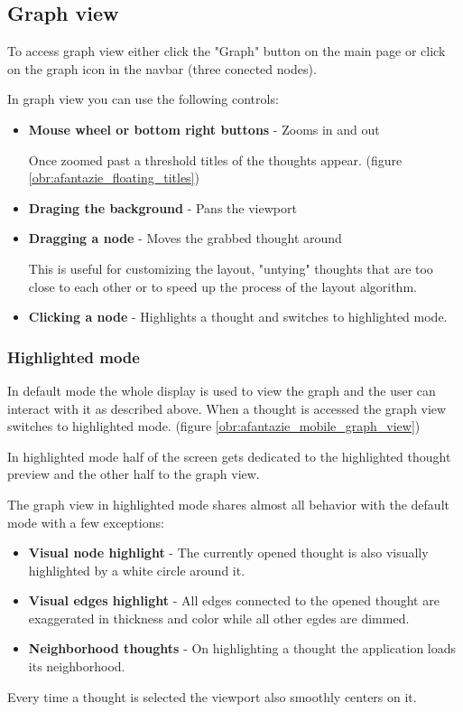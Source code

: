 \subsection{Graph view}
To access graph view either click the "Graph" button on the main page
or click on the graph icon in the navbar (three conected nodes).

In graph view you can use the following controls:
\begin{itemize}
  \item \textbf{Mouse wheel or bottom right buttons} - Zooms in and out

  Once zoomed past a threshold titles of the thoughts appear. (figure \ref{obr:afantazie_floating_titles})
  \item \textbf{Draging the background} - Pans the viewport
  \item \textbf{Dragging a node} - Moves the grabbed thought around
  
  This is useful for customizing the layout, "untying" thoughts that are too close to each other or to speed up the process of the layout algorithm. 
  \item \textbf{Clicking a node} - Highlights a thought and switches to highlighted mode.
\end{itemize}

\subsubsection*{Highlighted mode}

In default mode the whole display is used to view the graph and the user can interact with it as described above.
When a thought is accessed the graph view switches to highlighted mode. (figure \ref{obr:afantazie_mobile_graph_view})

In highlighted mode half of the screen gets dedicated to the highlighted thought preview and the other half to the graph view.

The graph view in highlighted mode shares almost all behavior with the default mode with a few exceptions:
\begin{itemize}
  \item \textbf{Visual node highlight} - The currently opened thought is also visually highlighted by a white circle around it.
  \item \textbf{Visual edges highlight} - All edges connected to the opened thought are exaggerated in thickness and color while all other egdes are dimmed.
  \item \textbf{Neighborhood thoughts} - On highlighting a thought the application loads its neighborhood.
\end{itemize}
Every time a thought is selected the viewport also smoothly centers on it.


